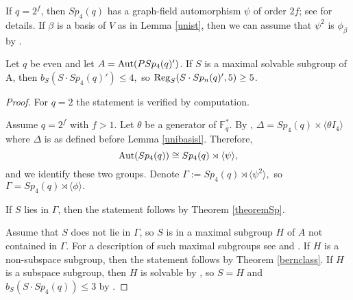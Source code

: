 If $q=2^f$, then $Sp_4(q)$ has a graph-field automorphism $\psi$ of order $2f$; see \cite[\S 12.3]{carsim} for details. If $\beta$ is a basis of $V$ as in Lemma \ref{unist}, then we can assume that $\psi^2$ is $\phi_{\beta}$ by \cite[Proposition 12.3.3]{carsim}. 



\begin{T5}
Let $q$ be even and let ${A}=\mathrm{Aut}(PSp_4(q)')$. If ${S} $ is a maximal solvable subgroup of  {A}, then $b_{{S}}({S} \cdot Sp_4(q)') \le 4,$ so $\mathrm{Reg}_S(S \cdot Sp_n(q)',5)\ge 5$.
\end{T5}
\begin{proof}
For $q=2$ the statement is verified by computation.

 Assume $q=2^f$ with $f>1.$ Let $\theta$ be a generator of $\mathbb{F}_q^*.$ By \cite[Proposition 2.4.3]{kleidlieb}, $\Delta =Sp_4(q) \times \langle \theta I_4 \rangle$ where $\Delta$ is as defined before Lemma \ref{unibasisl}. Therefore, $$\mathrm{Aut}(Sp_4(q)) \cong Sp_4(q) \rtimes \langle \psi \rangle,$$ and we identify these two groups. Denote $\Gamma:=Sp_4(q) \rtimes \langle \psi^2 \rangle,$ so $\Gamma = Sp_4(q) \rtimes \langle \phi \rangle.$
 
  If $S$ lies in $\Gamma$, then the statement follows by Theorem \ref{theoremSp}.
 
 Assume that $S$ does not lie in $\Gamma$, so $S$ is in a maximal subgroup $H$ of $A$ not contained in $\Gamma$. For a description of such maximal subgroups see \cite[\S 14]{asch} and \cite[Table 8.14]{maxlow}. If $H$ is a non-subspace subgroup, then the statement follows by Theorem \ref{bernclass}. If $H$ is a subspace subgroup, then $H$ is solvable by \cite[Table 8.14]{maxlow}, so $S=H$ and $b_S(S \cdot Sp_4(q))\le 3$ by \cite[Lemma 5.8]{burPS}. 
\end{proof}




